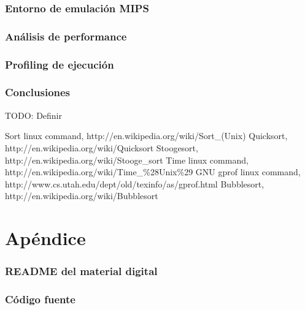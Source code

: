 \documentclass[a4paper,11pt]{article}
\begin{document}
\section{Entorno de emulación MIPS}

\section{Análisis de performance}

\section{Profiling de ejecución}

\section{Conclusiones}

TODO: Definir

\begin{thebibliography}{99}

 Sort linux command, http://en.wikipedia.org/wiki/Sort\_(Unix)
 Quicksort, http://en.wikipedia.org/wiki/Quicksort
 Stoogesort, http://en.wikipedia.org/wiki/Stooge\_sort
 Time linux command, http://en.wikipedia.org/wiki/Time\_\%28Unix\%29
 GNU gprof linux command, http://www.cs.utah.edu/dept/old/texinfo/as/gprof.html
 Bubblesort, http://en.wikipedia.org/wiki/Bubblesort

\end{thebibliography}

\clearpage

\part{Apéndice}
\appendix
\section{README del material digital}\label{sec:readme}



\section{Código fuente}\label{sec:source}
\clearpage
{}
\end{document}
